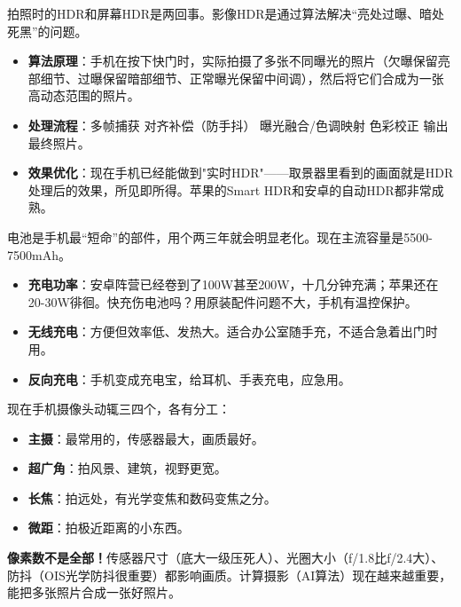 
拍照时的HDR和屏幕HDR是两回事。影像HDR是通过算法解决“亮处过曝、暗处死黑”的问题。

\begin{itemize}
  \item \textbf{算法原理}：手机在按下快门时，实际拍摄了多张不同曝光的照片（欠曝保留亮部细节、过曝保留暗部细节、正常曝光保留中间调），然后将它们合成为一张高动态范围的照片。
  \item \textbf{处理流程}：多帧捕获 对齐补偿（防手抖） 曝光融合/色调映射 色彩校正 输出最终照片。
  \item \textbf{效果优化}：现在手机已经能做到"实时HDR"——取景器里看到的画面就是HDR处理后的效果，所见即所得。苹果的Smart HDR和安卓的自动HDR都非常成熟。
\end{itemize}


电池是手机最“短命”的部件，用个两三年就会明显老化。现在主流容量是5500-7500mAh。

\begin{itemize}
  \item \textbf{充电功率}：安卓阵营已经卷到了100W甚至200W，十几分钟充满；苹果还在20-30W徘徊。快充伤电池吗？用原装配件问题不大，手机有温控保护。
  \item \textbf{无线充电}：方便但效率低、发热大。适合办公室随手充，不适合急着出门时用。
  \item \textbf{反向充电}：手机变成充电宝，给耳机、手表充电，应急用。
\end{itemize}


现在手机摄像头动辄三四个，各有分工：

\begin{itemize}
  \item \textbf{主摄}：最常用的，传感器最大，画质最好。
  \item \textbf{超广角}：拍风景、建筑，视野更宽。
  \item \textbf{长焦}：拍远处，有光学变焦和数码变焦之分。
  \item \textbf{微距}：拍极近距离的小东西。
\end{itemize}

\textbf{像素数不是全部！}传感器尺寸（底大一级压死人）、光圈大小（f/1.8比f/2.4大）、防抖（OIS光学防抖很重要）都影响画质。计算摄影（AI算法）现在越来越重要，能把多张照片合成一张好照片。


